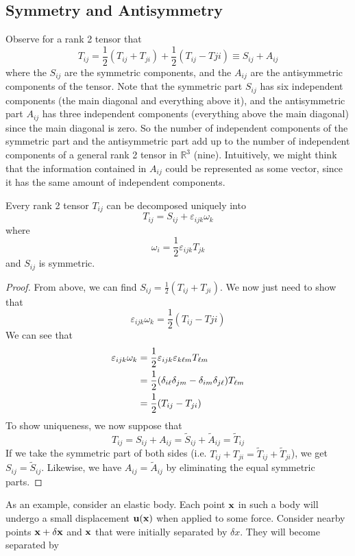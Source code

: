 \subsection{Symmetry and Antisymmetry}
Observe for a rank 2 tensor that
\[ T_{ij} = \frac{1}{2}\left( T_{ij} + T_{ji} \right) + \frac{1}{2}\left( T_{ij} - T{ji} \right) \equiv S_{ij} + A_{ij} \]
where the \(S_{ij}\) are the symmetric components, and the \(A_{ij}\) are the antisymmetric components of the tensor. Note that the symmetric part \(S_{ij}\) has six independent components (the main diagonal and everything above it), and the antisymmetric part \(A_{ij}\) has three independent components (everything above the main diagonal) since the main diagonal is zero. So the number of independent components of the symmetric part and the antisymmetric part add up to the number of independent components of a general rank 2 tensor in \(\mathbb R^3\) (nine). Intuitively, we might think that the information contained in \(A_{ij}\) could be represented as some vector, since it has the same amount of independent components.
\begin{proposition}
	Every rank 2 tensor \(T_{ij}\) can be decomposed uniquely into
	\[ T_{ij} = S_{ij} + \varepsilon_{ijk} \omega_k \]
	where
	\[ \omega_i = \frac{1}{2}\varepsilon_{ijk} T_{jk} \]
	and \(S_{ij}\) is symmetric.
\end{proposition}
\begin{proof}
	From above, we can find \(S_{ij} = \frac{1}{2}\left( T_{ij} + T_{ji} \right)\). We now just need to show that
	\[ \varepsilon_{ijk} \omega_k = \frac{1}{2}\left( T_{ij} - T{ji} \right) \]
	We can see that
	\begin{align*}
		\varepsilon_{ijk} \omega_k & = \frac{1}{2}\varepsilon_{ijk} \varepsilon_{k\ell m} T_{\ell m}                      \\
		                           & = \frac{1}{2}\qty(\delta_{i\ell} \delta_{jm} - \delta_{im}\delta_{j\ell}) T_{\ell m} \\
		                           & = \frac{1}{2}\qty(T_{ij} - T_{ji})
	\end{align*}
	To show uniqueness, we now suppose that
	\[ T_{ij} = S_{ij} + A_{ij} = \widetilde{S}_{ij} + \widetilde{A}_{ij} = \widetilde{T}_{ij} \]
	If we take the symmetric part of both sides (i.e. \(T_{ij} + T_{ji} = \widetilde{T}_{ij} + \widetilde{T}_{ji}\)), we get \(S_{ij} = \widetilde{S}_{ij}\). Likewise, we have \(A_{ij} = \widetilde{A}_{ij}\) by eliminating the equal symmetric parts.
\end{proof}
\noindent As an example, consider an elastic body. Each point \(\vb x\) in such a body will undergo a small displacement \(\vb u(\vb x)\) when applied to some force. Consider nearby points \(\vb x + \delta\vb x\) and \(\vb x\) that were initially separated by \(\delta x\). They will become separated by

